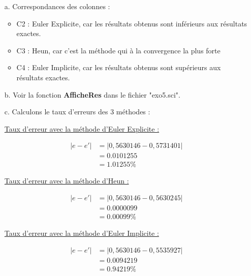 \documentclass[12pt, letterpaper]{article}
\begin{document}
\begin{enumerate}
\begin{enumerate}
\item[a.] Correspondances des colonnes :

  \begin{itemize}
  \item C2 : Euler Explicite, car les résultats obtenus sont
    inférieurs aux résultats exactes.
  \item C3 : Heun, car c'est la méthode qui à la convergence la plus forte
  \item C4 : Euler Implicite, car les résultats obtenus sont
    supérieurs aux résultats exactes.
  \end{itemize}

\item[b.] Voir la fonction \textbf{AfficheRes} dans le fichier
  "exo5.sci".

\item[c.] Calculons le taux d'erreurs des 3 méthodes :

  \underline{Taux d'erreur avec la méthode d'Euler Explicite :}

  \begin{equation*}
    \begin{split}
      \left\lvert e - e' \right\rvert & = \left\lvert 0,5630146 - 0,5731401
        \right\rvert \\
        & = 0.0101255 \\
        & = 1.01255 \%
    \end{split}
  \end{equation*}

  \underline{Taux d'erreur avec la méthode d'Heun :}

  \begin{equation*}
    \begin{split}
      \left\lvert e - e' \right\rvert & = \left\lvert 0,5630146 - 0,5630245
        \right\rvert \\
        & = 0.0000099 \\
        & = 0.00099 \%
    \end{split}
  \end{equation*}

  \underline{Taux d'erreur avec la méthode d'Euler Implicite :}

  \begin{equation*}
    \begin{split}
      \left\lvert e - e' \right\rvert & = \left\lvert 0,5630146 - 0,5535927
        \right\rvert \\
        & = 0.0094219 \\
        & = 0.94219 \%
    \end{split}
  \end{equation*}


\end{enumerate}
\end{enumerate}
\end{document}
